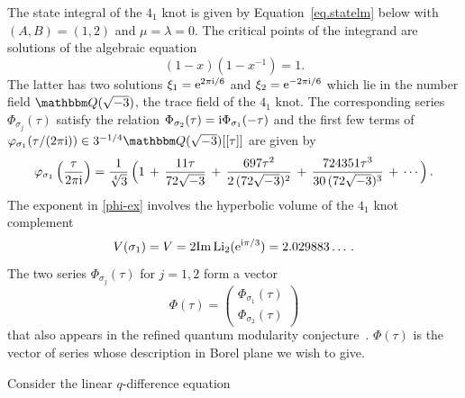 \documentclass[12pt,reqno]{amsart}
\theoremstyle{definition}
\def\BQ{\mathbbm Q}
\def\s{\sigma}
\def\+{\,+\,}
\def\ri{\mathrm{i}}
\def\re{{\rm e}}
\def\ri{{\rm i}}
\begin{document}

The state integral of the $4_1$ knot is given by
Equation~\eqref{eq.statelm} below with $(A,B)=(1,2)$ and
$\mu=\lambda=0$. The critical points of the integrand are solutions of
the algebraic equation
\begin{equation}
  \label{41xi}
  (1-x)(1-x^{-1})=1.
\end{equation}
The latter has two solutions $\xi_1= {\rm e}^{2 \pi \ri/6}$ and
$\xi_2= \re^{-2 \pi \ri/6}$ which lie in the number field
$\BQ(\sqrt{-3})$, the trace field of the $4_1$ knot. The corresponding
series $\Phi_{\s_j}(\tau)$ satisfy the relation
$\Phi_{\s_2}(\tau) = {\rm i} \Phi_{\s_1}(-\tau)$ and the first few
terms of
$\varphi_{\s_1}(\tau/(2\pi \ri)) \in 3^{-1/4} \BQ(\sqrt{-3})[[\tau]]$
are given by
\begin{equation}
  \label{varphi41}
  \varphi_{\s_1}\left(\frac{\tau}{2\pi \ri}\right) =
  \frac{1}{\sqrt[4]3}\, 
  \Bigl(1 \+ \frac{11\tau}{72\sqrt{-3}}
  \+ \frac{697\tau^2}{2\,(72\sqrt{-3})^2}
  \+ \frac{724351\tau^3}{30\,(72\sqrt{-3})^3} \+\cdots\Bigr)\,. 
\end{equation}
The exponent in \eqref{phi-ex} involves the hyperbolic volume of the
$4_1$ knot complement
%
\begin{equation}
  \label{volume-41}
  V(\s_1)= V=2 {\rm Im}\, {\rm Li}_2(\re^{\ri \pi/3})= 2.029883\dots \,.
\end{equation}
%
The two series $\Phi_{\s_{j}}(\tau)$ for $j=1,2$ form a vector
%
\begin{equation}
  \label{phivec}
  \Phi(\tau)=
  \begin{pmatrix} \Phi_{\s_1}(\tau)\\ \Phi_{\s_2}(\tau) \end{pmatrix}
\end{equation}
%
that also appears in the refined quantum modularity
conjecture~\cite{GZ:kashaev}. $\Phi(\tau)$ is the vector of series
whose description in Borel plane we wish to give.

Consider the linear $q$-difference equation
\end{document}
